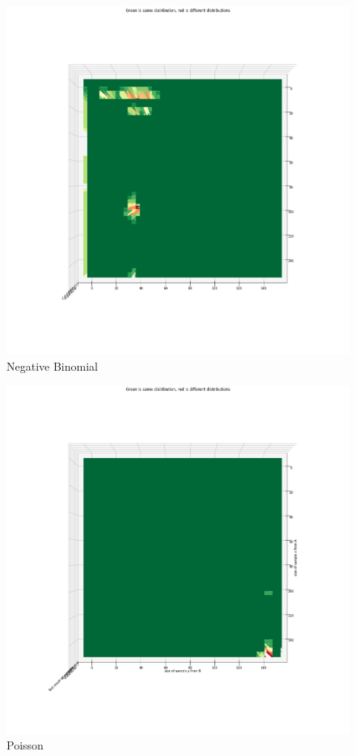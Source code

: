 \begin{figure}[htb]
  \centering
  \includegraphics[width=\linewidth]{./img/hypothesis_test/appendix/naive_neg_bin.png}
  \caption{Negative Binomial}
\end{figure}
\clearpage
\begin{figure}[htb]
  \centering
  \includegraphics[width=\linewidth]{./img/hypothesis_test/appendix/naive_poisson.png}
  \caption{Poisson}
\end{figure}
